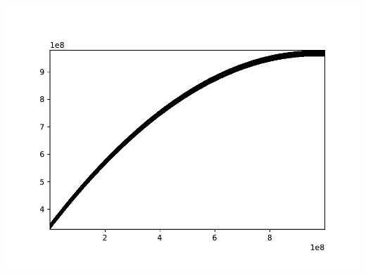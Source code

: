 \begin{frame}
\begin{overprint}
		\centering
		\includegraphics[height=0.8\textheight]{./visuals/4}
	\end{overprint}

\end{frame}
